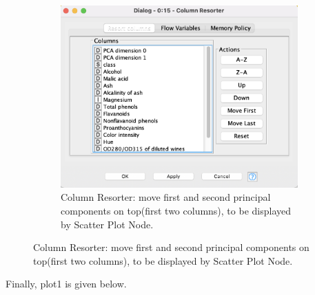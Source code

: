 \documentclass[11pt]{article}
\begin{document}
\begin{figure}[H]
\begin{subfigure}{0.4\textwidth}
					\includegraphics[width=\textwidth]{res/t1/t11/t11-column-resorter-conf}
					\caption{Column Resorter: move first and second principal components on top(first two columns), to be displayed by Scatter Plot Node.}
					\label{fig:second}
				\end{subfigure}
				\hfill
			\end{figure}
			\fi
			Finally, plot1 is given below.

\end{document}
